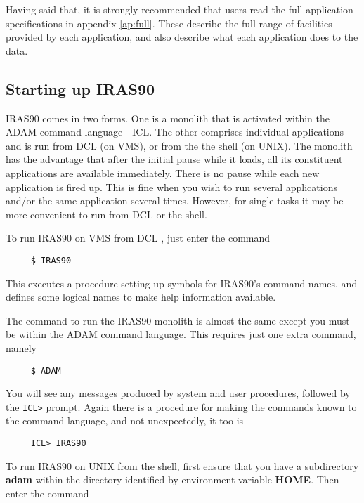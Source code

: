 Having said that, it is strongly recommended that users read the full
application specifications in appendix \ref{ap:full}. These describe the full
range of facilities provided by each application, and also describe what each
application does to the data.

\subsection{Starting up IRAS90}
{\small IRAS90} comes in two forms.  One is a monolith that is activated within
the {\small ADAM} command language---{\small ICL}.  The other comprises
individual applications and is run from {\small DCL} (on {\small VMS}), or from
the the shell (on {\small UNIX}).  The monolith has the advantage that after the
initial pause while it loads, all its constituent applications are available
immediately.  There is no pause while each new application is fired up.  This is
fine when you wish to run several applications and/or the same application
several times. However, for single tasks it may be more convenient to run from
{\small DCL} or the shell.

To run {\small IRAS90} on {\small VMS} from {\small DCL} , just enter the
command

\small
\begin{verbatim}
     $ IRAS90
\end{verbatim}
\normalsize

This executes a procedure setting up symbols for {\small IRAS90}'s command
names, and defines some logical names to make help information available.

The command to run the {\small IRAS90} monolith is almost the same except you
must be within the {\small ADAM} command language.  This requires just one extra
command, namely

\small
\begin{verbatim}
     $ ADAM
\end{verbatim}
\normalsize

You will see any messages produced by system and user procedures, followed
by the {\tt ICL>} prompt. Again there is a procedure for making the
commands known to the command language, and not unexpectedly, it too is

\small
\begin{verbatim}
     ICL> IRAS90
\end{verbatim}
\normalsize

To run {\small IRAS90} on {\small UNIX} from the shell, first ensure that you
have a subdirectory {\bf adam} within the directory identified by environment
variable {\bf HOME}. Then enter the command

